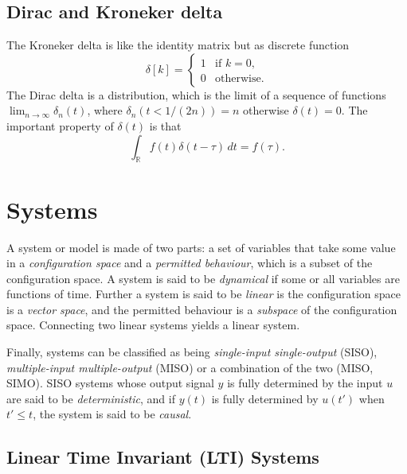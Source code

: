 \subsection{Dirac and Kroneker delta}

The Kroneker delta is like the identity matrix but as discrete function
\[
	\delta[k] = \begin{cases}
		1 & \text{if } k = 0, \\
		0 & \text{otherwise}.
	\end{cases}
\]
The Dirac delta is a distribution, which
is the limit of a sequence of functions $\lim_{n \to \infty} \delta_n(t)$,
where $\delta_n(t < 1/(2n)) = n$ otherwise $\delta(t) = 0$. The important
property of $\delta(t)$ is that
\[
	\int_\mathbb{R} f(t) \delta(t - \tau) \, dt = f(\tau).
\]

\section{Systems}

A system or model is made of two parts: a set of variables that take some
value in a \emph{configuration space} and a \emph{permitted behaviour}, which
is a subset of the configuration space. A system is said to be
\emph{dynamical} if some or all variables are functions of time. Further a
system is said to be \emph{linear} is the configuration space is a
\emph{vector space}, and the permitted behaviour is a \emph{subspace} of the
configuration space. Connecting two linear systems yields a linear system.

Finally, systems can be classified as being \emph{single-input single-output}
(SISO), \emph{multiple-input multiple-output} (MISO) or a combination of the
two (MISO, SIMO). SISO systems whose output signal $y$ is fully determined by the
input $u$ are said to be \emph{deterministic}, and if $y(t)$ is fully determined
by $u(t')$ when $t' \leq t$, the system is said to be \emph{causal}.

\subsection{Linear Time Invariant (LTI) Systems}
